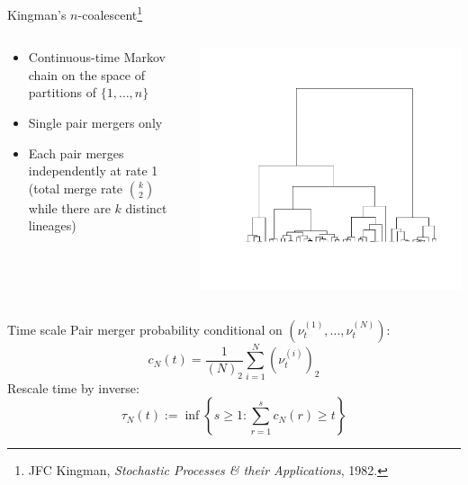 \documentclass[aspectratio=169]{beamer}
\theoremstyle{definition}
\newcommand{\vt}[2][t]{\nu_{#1}^{(#2)}}
\begin{document}
\begin{frame}{Kingman's $n$-coalescent\footnote[frame]{JFC Kingman, \textit{Stochastic Processes \& their Applications}, 1982.}}
\begin{columns}
\begin{column}{0.45\textwidth}
\begin{itemize}
\item Continuous-time Markov chain on the space of partitions of $\{1,\dots,n\}$
\item Single pair mergers only
\item Each pair merges independently at rate 1 (total merge rate $\binom{k}{2}$ while there are $k$ distinct lineages)
\end{itemize}
\end{column}
\begin{column}{0.45\textwidth}
\includegraphics[width=\textwidth, trim={2.8cm 3cm 1.5cm 2cm}, clip]{ncoalescent.pdf}
\end{column}
\end{columns}
\end{frame}


\begin{frame}{Time scale}
Pair merger probability conditional on $( \vt{1},\dots, \vt{N} )$:
\begin{equation*}
c_N(t) = \frac{1}{(N)_2} \sum_{i=1}^N (\vt{i})_2
\end{equation*}
Rescale time by inverse:
\begin{equation*}
\tau_N(t) := \inf\left\{ s\geq 1 : \sum_{r=1}^s c_N(r) \geq t \right\}
\end{equation*}
\end{frame}
\end{document}

